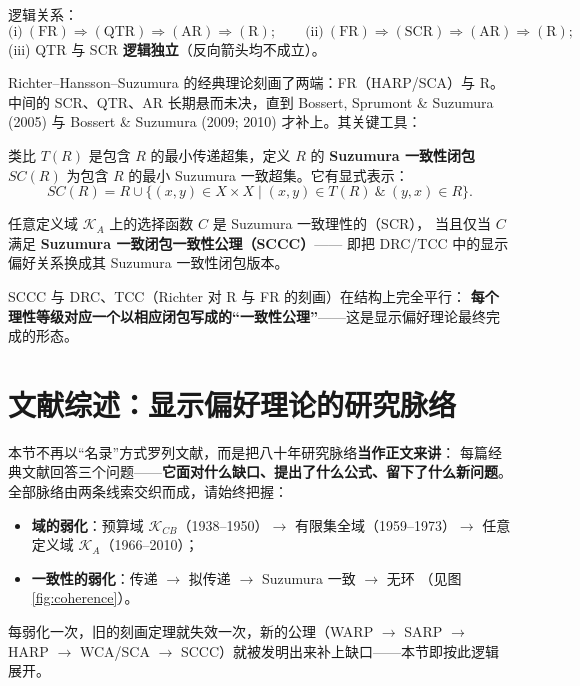 逻辑关系：
\[
\text{(i)}\ (\mathrm{FR})\Rightarrow(\mathrm{QTR})\Rightarrow(\mathrm{AR})\Rightarrow(\mathrm{R});\qquad
\text{(ii)}\ (\mathrm{FR})\Rightarrow(\mathrm{SCR})\Rightarrow(\mathrm{AR})\Rightarrow(\mathrm{R});
\]
(iii) QTR 与 SCR \textbf{逻辑独立}（反向箭头均不成立）。

Richter--Hansson--Suzumura 的经典理论刻画了两端：FR（HARP/SCA）与 R。
中间的 SCR、QTR、AR 长期悬而未决，直到 Bossert, Sprumont \& Suzumura (2005)
与 Bossert \& Suzumura (2009; 2010) 才补上。其关键工具：

\begin{definition}
类比 $T(R)$ 是包含 $R$ 的最小传递超集，定义 $R$ 的 \textbf{Suzumura 一致性闭包}
$SC(R)$ 为包含 $R$ 的最小 Suzumura 一致超集。它有显式表示：
\begin{equation}
SC(R)=R\cup\{(x,y)\in X\times X \mid (x,y)\in T(R)\ \&\ (y,x)\in R\}. \label{eq:SCR}
\end{equation}
\end{definition}

\begin{theorem}
任意定义域 $\mathcal{K}_A$ 上的选择函数 $C$ 是 Suzumura 一致理性的（SCR），
当且仅当 $C$ 满足 \textbf{Suzumura 一致闭包一致性公理（SCCC）}——
即把 DRC/TCC 中的显示偏好关系换成其 Suzumura 一致性闭包版本。
\end{theorem}

\noindent SCCC 与 DRC、TCC（Richter 对 R 与 FR 的刻画）在结构上完全平行：
\textbf{每个理性等级对应一个以相应闭包写成的“一致性公理”}——这是显示偏好理论最终完成的形态。

\section{文献综述：显示偏好理论的研究脉络}

本节不再以“名录”方式罗列文献，而是把八十年研究脉络\textbf{当作正文来讲}：
每篇经典文献回答三个问题——\textbf{它面对什么缺口、提出了什么公式、留下了什么新问题}。
全部脉络由两条线索交织而成，请始终把握：
\begin{itemize}
  \item \textbf{域的弱化}：预算域 $\mathcal{K}_{CB}$（1938--1950）$\to$
  有限集全域（1959--1973）$\to$ 任意定义域 $\mathcal{K}_A$（1966--2010）；
  \item \textbf{一致性的弱化}：传递 $\to$ 拟传递 $\to$ Suzumura 一致 $\to$ 无环
  （见图 \ref{fig:coherence}）。
\end{itemize}
每弱化一次，旧的刻画定理就失效一次，新的公理（WARP $\to$ SARP $\to$ HARP
$\to$ WCA/SCA $\to$ SCCC）就被发明出来补上缺口——本节即按此逻辑展开。

